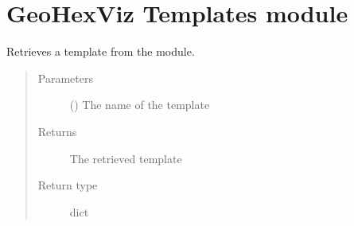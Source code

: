 \documentclass[letterpaper,10pt,english]{sphinxmanual}
\begin{document}

\begin{fulllineitems}
\label{\detokenize{errors:geohexviz.errors.NoLayersError}}
\end{fulllineitems}



\chapter{GeoHexViz \sphinxhyphen{} Templates module}
\label{\detokenize{templates:module-geohexviz.templates}}\label{\detokenize{templates:geohexviz-templates-module}}\label{\detokenize{templates::doc}}

\begin{fulllineitems}
\label{\detokenize{templates:geohexviz.templates.get_template}}
\sphinxAtStartPar
Retrieves a template from the module.
\begin{quote}\begin{description}
\item[{Parameters}] \leavevmode
\sphinxAtStartPar
{} () \textendash{} The name of the template

\item[{Returns}] \leavevmode
\sphinxAtStartPar
The retrieved template

\item[{Return type}] \leavevmode
\sphinxAtStartPar
dict

\end{description}\end{quote}

\end{fulllineitems}
\end{document}
